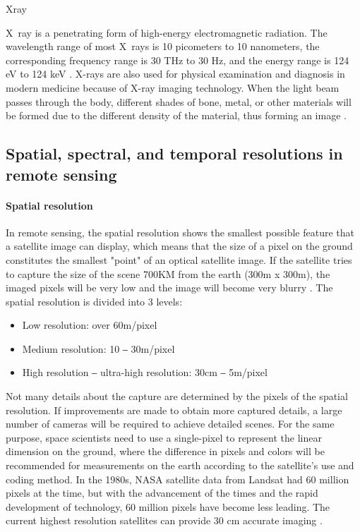 \documentclass[conference]{IEEEtran}
\newcommand{\subparagraph}{}
\begin{document}
\subparagraph{X\-ray}
    
X\ ray is a penetrating form of high-energy electromagnetic radiation. The wavelength range of most X\ rays is 10 picometers to 10 nanometers, the corresponding frequency range is 30 THz to 30 Hz, and the energy range is 124 eV to 124 keV \cite{XrayWiki61:online}. X-rays are also used for physical examination and diagnosis in modern medicine because of X-ray imaging technology. When the light beam passes through the body, different shades of bone, metal, or other materials will be formed due to the different density of the material, thus forming an image \cite{XrayImag8:online}.

\subsection{Spatial, spectral, and temporal resolutions in remote sensing}
    
\paragraph{Spatial resolution} 
    
In remote sensing, the spatial resolution shows the smallest possible feature that a satellite image can display, which means 
that the size of a pixel on the ground constitutes the smallest "point" of an optical satellite image. If the satellite tries 
to capture the size of the scene 700KM from the earth (300m x 300m), the imaged pixels will be very low and the image will become 
very blurry \cite{AtlasAIW26:online}. The spatial resolution is divided into 3 levels:
    
    \begin{itemize}
        \item Low resolution: over 60m/pixel 
        \item Medium resolution: 10 ‒ 30m/pixel 
        \item High resolution ‒ ultra-high resolution: 30cm ‒ 5m/pixel
    \end{itemize}
    
Not many details about the capture are determined by the pixels of the spatial resolution. If improvements are made to obtain 
more captured details, a large number of cameras will be required to achieve detailed scenes. For the same purpose, space scientists 
need to use a single-pixel to represent the linear dimension on the ground, where the difference in pixels and colors will be 
recommended for measurements on the earth according to the satellite's use and coding method. In the 1980s, NASA satellite data from 
Landsat had 60 million pixels at the time, but with the advancement of the times and the rapid development of technology, 60 million 
pixels have become less leading. The current highest resolution satellites can provide 30 cm accurate imaging \cite{Satellit48:online}. 
\end{document}
